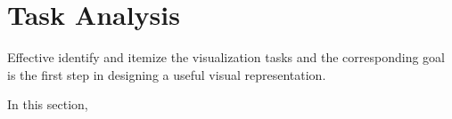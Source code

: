 \section{Task Analysis}
Effective identify and itemize the visualization tasks and the corresponding goal is the first step in designing a useful visual representation.

In this section,
